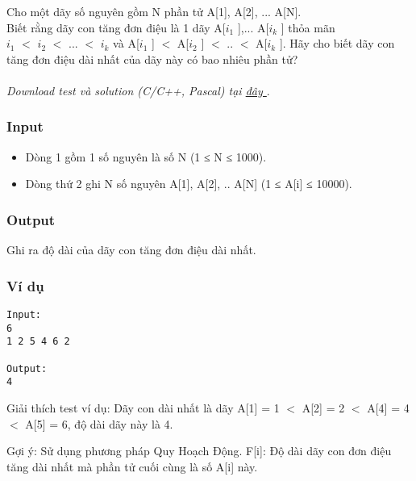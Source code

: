 



   Cho một dãy số nguyên gồm N phần tử A[1], A[2], ... A[N].   
\\   Biết rằng dãy con tăng đơn điệu là 1 dãy A[$i_{1}$   ],... A[$i_{k}$   ] thỏa mãn   
\\   $i_{1}$   $<$ $i_{2}$   $<$ ... $<$ $i_{k}$   và A[$i_{1}$   ] $<$ A[$i_{2}$   ] $<$ .. $<$ A[$i_{k}$   ]. Hãy cho biết dãy con tăng đơn điệu dài nhất của dãy này có bao nhiêu phần tử?   
\\
\\\textit{    Download test và solution (C/C++, Pascal) tại    \href{https://vn.spoj.pl/content/liq.zip}{     đây    }}   .  

\subsubsection{   Input  }
\begin{itemize}
	\item     Dòng 1 gồm 1 số nguyên là số N (1 ≤ N ≤ 1000).   
	\item     Dòng thứ 2 ghi N số nguyên A[1], A[2], .. A[N] (1 ≤ A[i] ≤ 10000).   
\end{itemize}

\subsubsection{   Output  }

   Ghi ra độ dài của dãy con tăng đơn điệu dài nhất.  

\subsubsection{   Ví dụ  }
\begin{verbatim}
Input:
6
1 2 5 4 6 2 

Output:
4
\end{verbatim}

       Giải thích test ví dụ:      Dãy con dài nhất là dãy A[1] = 1 $<$ A[2] = 2 $<$ A[4] = 4 $<$ A[5] = 6, độ dài dãy này là 4.  

       Gợi ý:      Sử dụng phương pháp Quy Hoạch Động. F[i]: Độ dài dãy con đơn điệu tăng dài nhất mà phần tử cuối cùng là số A[i] này.  
